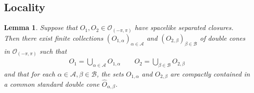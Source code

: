 \documentclass[11pt,b5paper,notitlepage]{article}
\theoremstyle{definition}
\theoremstyle{plain}
\newtheorem{lm}[df]{Lemma}
\newcommand{\wht}{\widehat}
\newcommand{\scr}{\mathscr}
\newcommand{\Opp}{\mathcal O_{(-\pi,\pi)}}
\numberwithin{equation}{section}
\begin{document}
\subsection{Locality}\label{lb80}






\begin{lm}\label{lb77}
Suppose that $O_1,O_2\in\Opp$ have spacelike separated closures. Then there exist finite collections $(O_{1,\alpha})_{\alpha\in\scr A}$ and $(O_{2,\beta})_{\beta\in\scr B}$ of double cones in $\Opp$ such that
\begin{align*}
O_1=\bigcup_{\alpha\in\scr A} O_{1,\alpha}\qquad O_2=\bigcup_{\beta\in\scr B} O_{2,\beta}
\end{align*}
and that for each $\alpha\in\scr A,\beta\in\scr B$, the sets $O_{1,\alpha}$ and $O_{2,\beta}$ are compactly contained in a common standard double cone $\wht O_{\alpha,\beta}$.
\end{lm}
\end{document}

